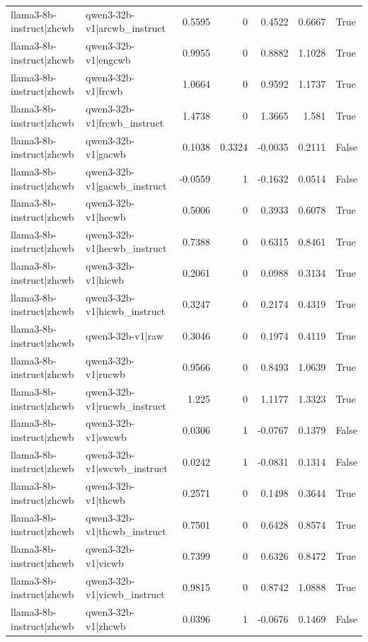 \begin{table}
\begin{tabular}{l l r r r r l}
llama3-8b-instruct|zhcwb & qwen3-32b-v1|arcwb_instruct & 0.5595 & 0 & 0.4522 & 0.6667 & True \\
llama3-8b-instruct|zhcwb & qwen3-32b-v1|engcwb & 0.9955 & 0 & 0.8882 & 1.1028 & True \\
llama3-8b-instruct|zhcwb & qwen3-32b-v1|frcwb & 1.0664 & 0 & 0.9592 & 1.1737 & True \\
llama3-8b-instruct|zhcwb & qwen3-32b-v1|frcwb_instruct & 1.4738 & 0 & 1.3665 & 1.581 & True \\
llama3-8b-instruct|zhcwb & qwen3-32b-v1|gacwb & 0.1038 & 0.3324 & -0.0035 & 0.2111 & False \\
llama3-8b-instruct|zhcwb & qwen3-32b-v1|gacwb_instruct & -0.0559 & 1 & -0.1632 & 0.0514 & False \\
llama3-8b-instruct|zhcwb & qwen3-32b-v1|hecwb & 0.5006 & 0 & 0.3933 & 0.6078 & True \\
llama3-8b-instruct|zhcwb & qwen3-32b-v1|hecwb_instruct & 0.7388 & 0 & 0.6315 & 0.8461 & True \\
llama3-8b-instruct|zhcwb & qwen3-32b-v1|hicwb & 0.2061 & 0 & 0.0988 & 0.3134 & True \\
llama3-8b-instruct|zhcwb & qwen3-32b-v1|hicwb_instruct & 0.3247 & 0 & 0.2174 & 0.4319 & True \\
llama3-8b-instruct|zhcwb & qwen3-32b-v1|raw & 0.3046 & 0 & 0.1974 & 0.4119 & True \\
llama3-8b-instruct|zhcwb & qwen3-32b-v1|rucwb & 0.9566 & 0 & 0.8493 & 1.0639 & True \\
llama3-8b-instruct|zhcwb & qwen3-32b-v1|rucwb_instruct & 1.225 & 0 & 1.1177 & 1.3323 & True \\
llama3-8b-instruct|zhcwb & qwen3-32b-v1|swcwb & 0.0306 & 1 & -0.0767 & 0.1379 & False \\
llama3-8b-instruct|zhcwb & qwen3-32b-v1|swcwb_instruct & 0.0242 & 1 & -0.0831 & 0.1314 & False \\
llama3-8b-instruct|zhcwb & qwen3-32b-v1|thcwb & 0.2571 & 0 & 0.1498 & 0.3644 & True \\
llama3-8b-instruct|zhcwb & qwen3-32b-v1|thcwb_instruct & 0.7501 & 0 & 0.6428 & 0.8574 & True \\
llama3-8b-instruct|zhcwb & qwen3-32b-v1|vicwb & 0.7399 & 0 & 0.6326 & 0.8472 & True \\
llama3-8b-instruct|zhcwb & qwen3-32b-v1|vicwb_instruct & 0.9815 & 0 & 0.8742 & 1.0888 & True \\
llama3-8b-instruct|zhcwb & qwen3-32b-v1|zhcwb & 0.0396 & 1 & -0.0676 & 0.1469 & False \\

\end{tabular}
\end{table}
